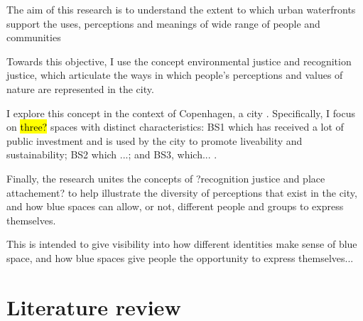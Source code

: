 \documentclass{article}
\begin{document}
The aim of this research is to understand the extent to which urban waterfronts support the uses, perceptions and meanings of wide range of people and communities

Towards this objective, I use the concept environmental justice and recognition justice, which articulate the ways in which people's perceptions and values of nature are represented in the city.

I explore this concept in the context of Copenhagen, a city . Specifically, I focus on \hl{three?} spaces with distinct characteristics: BS1 which has received a lot of public investment and is used by the city to promote liveability and sustainability; BS2 which ...; and BS3, which... .

Finally, the research unites the concepts of ?recognition justice and place attachement? to help illustrate the diversity of perceptions that exist in the city, and how blue spaces can allow, or not, different people and groups to express themselves. 

This is intended to give visibility into how different identities make sense of blue space, and how blue spaces give people the opportunity to express themselves...

\pagebreak
\section{Literature review}


\end{document}
